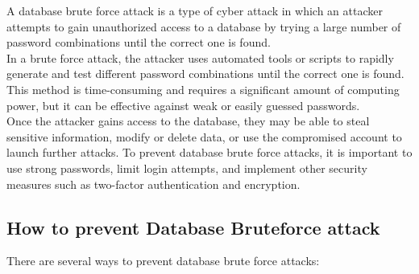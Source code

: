 \documentclass[11pt]{article}
\begin{document}
A database brute force attack is a type of cyber attack in which an attacker attempts to gain unauthorized access to a database by trying a large number of password combinations until the correct one is found.\\

In a brute force attack, the attacker uses automated tools or scripts to rapidly generate and test different password combinations until the correct one is found. This method is time-consuming and requires a significant amount of computing power, but it can be effective against weak or easily guessed passwords.\\

Once the attacker gains access to the database, they may be able to steal sensitive information, modify or delete data, or use the compromised account to launch further attacks. To prevent database brute force attacks, it is important to use strong passwords, limit login attempts, and implement other security measures such as two-factor authentication and encryption.\\

\subsection{How to prevent Database Bruteforce attack}
\label{sec:org73674f9}

There are several ways to prevent database brute force attacks:\\
\end{document}
